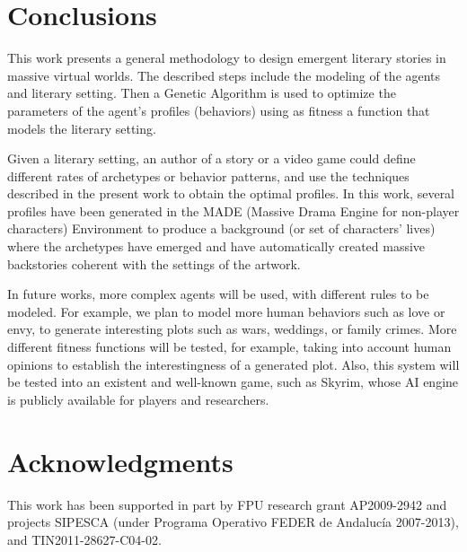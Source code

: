 \documentclass[letterpaper]{article}
\begin{document}
\section{Conclusions}
\label{sec:conclusion}



This work presents a general methodology to design emergent literary stories in massive virtual worlds. The described steps include the modeling of the agents and literary setting. Then a Genetic Algorithm is used to optimize the parameters of the agent's profiles (behaviors) using
as fitness a function that models the literary setting. 

Given a literary setting, an author of a story or a video game could define 
different rates of archetypes or behavior patterns, and use the techniques described in
the present work to obtain the optimal profiles. In this work, several profiles have been generated in the MADE (Massive Drama Engine for non-player characters) Environment to produce a background (or set of characters' lives)
where the archetypes have emerged and have automatically created massive backstories coherent
with the settings of the artwork.

In future works, more complex agents will be used, with different rules to be modeled. For example, we plan to model more human behaviors such as love or envy, to generate interesting plots such as wars, weddings, or family crimes. More different fitness functions will be tested, for example, taking into account human opinions to establish the interestingness of a generated plot. Also, this system will be tested into an existent and well-known game, such as Skyrim\texttrademark, whose AI engine is publicly available for players and researchers.


\section{Acknowledgments}

This work has been supported in part by FPU research grant AP2009-2942 and projects SIPESCA (under Programa Operativo FEDER de Andalucía 2007-2013), and TIN2011-28627-C04-02.
\footnotesize


\end{document}
